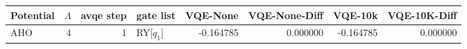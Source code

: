 \begin{tabular}{lrrlrrrr}
\toprule
Potential & $\Lambda$ & avqe step & gate list & VQE-None & VQE-None-Diff & VQE-10k & VQE-10K-Diff \\
\midrule
AHO & 4 & 1 & RY[$q_1$] & -0.164785 & 0.000000 & -0.164785 & 0.000000 \\
\bottomrule
\end{tabular}
